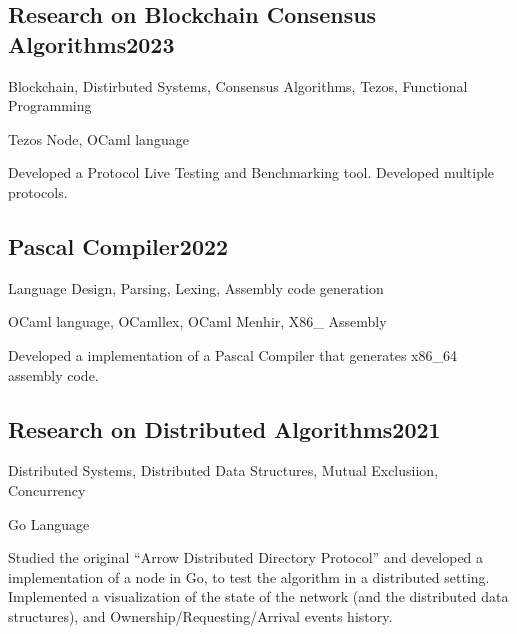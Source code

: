 \documentclass[a4paper, 12pt]{article}
\begin{document}
\subsection {{Research on Blockchain Consensus Algorithms}\hfill 2023}
\begin{zitemize}
\item Blockchain, Distirbuted Systems, Consensus Algorithms, Tezos, Functional Programming
\item Tezos Node, OCaml language
\item Developed a Protocol Live Testing and Benchmarking tool. Developed multiple protocols.
\end{zitemize}

\vspace*{6pt}
\subsection {{Pascal Compiler}\hfill 2022}
\begin{zitemize}
\item Language Design, Parsing, Lexing, Assembly code generation
\item OCaml language, OCamllex, OCaml Menhir, X86\_ Assembly
\item Developed a implementation of a Pascal Compiler that generates x86\_64 assembly code.
\end{zitemize}


\vspace*{6pt}
\subsection {{Research on Distributed Algorithms}\hfill 2021}
\begin{zitemize}
\item Distributed Systems, Distributed Data Structures, Mutual Exclusiion, Concurrency
\item Go Language
\item Studied the original ``Arrow Distributed Directory Protocol'' and developed a implementation of a node in Go, to test the algorithm in a distributed setting. Implemented a visualization of the state of the network (and the distributed data structures), and Ownership/Requesting/Arrival events history.
\end{zitemize}
\end{document}
